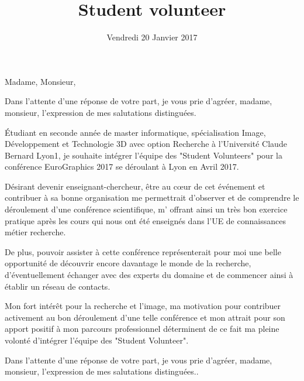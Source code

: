 \documentclass[12pt,a4paper,sans]{moderncv}        %
\title{\Large Student volunteer}                               %
\begin{document}
\date{Vendredi 20 Janvier 2017}
\opening{Madame, Monsieur,}
\closing{Dans l'attente d'une r\'eponse de votre part, je vous prie d'agr\'eer, madame, monsieur, l'expression de mes salutations distingu\'ees.}
\makelettertitle

\justify
\'Etudiant en seconde ann\'ee de master informatique, sp\'ecialisation Image, D\'eveloppement et Technologie 3D avec option Recherche \`a l’Universit\'e Claude Bernard Lyon1, je souhaite int\'egrer l’\'equipe des "Student Volunteers" pour la conf\'erence EuroGraphics 2017 se d\'eroulant \`a Lyon en Avril 2017.

D\'esirant devenir enseignant-chercheur, \^etre au cœur de cet \'ev\'enement et contribuer \`a sa bonne organisation me permettrait d’observer et de comprendre le d\'eroulement d’une conf\'erence scientifique, m' offrant ainsi un tr\`es bon exercice pratique apr\`es les cours qui nous ont \'et\'e enseign\'es dans l’UE de connaissances m\'etier recherche.

De plus, pouvoir assister \`a cette conf\'erence repr\'esenterait pour moi une belle opportunit\'e de d\'ecouvrir encore davantage le monde de la recherche, d'\'eventuellement \'echanger avec des experts du domaine et de commencer ainsi \`a \'etablir un r\'eseau de contacts.

Mon fort int\'er\^et pour la recherche et l’image, ma motivation pour contribuer activement au bon d\'eroulement d'une telle conf\'erence et mon attrait pour son apport positif \`a mon parcours professionnel d\'eterminent de ce fait ma pleine volont\'e d'int\'egrer l'\'equipe des "Student Volunteer".

Dans l’attente d’une r\'eponse de votre part, je vous prie d’agr\'eer, madame, monsieur,
l’expression de mes salutations distingu\'ees..
\vspace{0.3cm}

\makeletterclosing
\end{document}
